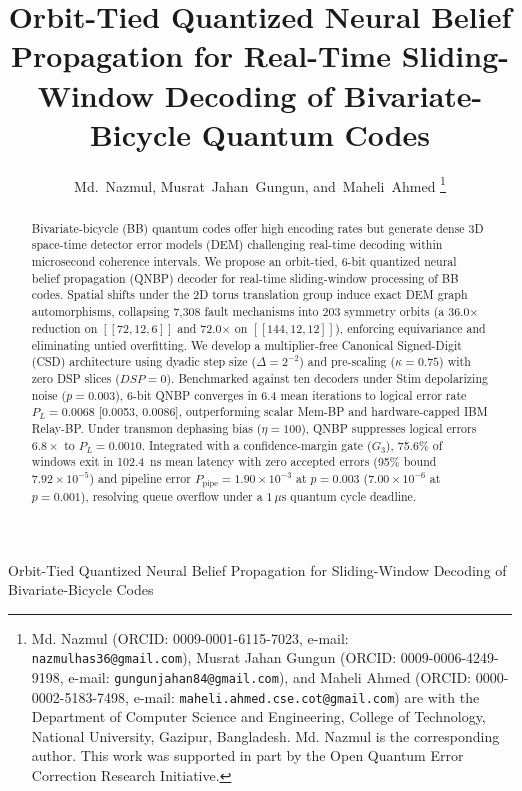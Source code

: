 \documentclass[journal]{IEEEtran}
\begin{document}
\title{Orbit-Tied Quantized Neural Belief Propagation for Real-Time Sliding-Window Decoding of Bivariate-Bicycle Quantum Codes}

\author{Md.~Nazmul,
        Musrat~Jahan~Gungun,
        and~Maheli~Ahmed%
\thanks{Md. Nazmul (ORCID: 0009-0001-6115-7023, e-mail: \texttt{nazmulhas36@gmail.com}), Musrat Jahan Gungun (ORCID: 0009-0006-4249-9198, e-mail: \texttt{gungunjahan84@gmail.com}), and Maheli Ahmed (ORCID: 0000-0002-5183-7498, e-mail: \texttt{maheli.ahmed.cse.cot@gmail.com}) are with the Department of Computer Science and Engineering, College of Technology, National University, Gazipur, Bangladesh. Md. Nazmul is the corresponding author. This work was supported in part by the Open Quantum Error Correction Research Initiative.}}

%
{Orbit-Tied Quantized Neural Belief Propagation for Sliding-Window Decoding of Bivariate-Bicycle Codes}

\maketitle

\begin{abstract}
Bivariate-bicycle (BB) quantum codes offer high encoding rates but generate dense 3D space-time detector error models (DEM) challenging real-time decoding within microsecond coherence intervals. We propose an orbit-tied, 6-bit quantized neural belief propagation (QNBP) decoder for real-time sliding-window processing of BB codes. Spatial shifts under the 2D torus translation group induce exact DEM graph automorphisms, collapsing 7,308 fault mechanisms into 203 symmetry orbits (a 36.0$\times$ reduction on $[[72,12,6]]$ and 72.0$\times$ on $[[144,12,12]]$), enforcing equivariance and eliminating untied overfitting. We develop a multiplier-free Canonical Signed-Digit (CSD) architecture using dyadic step size ($\Delta = 2^{-2}$) and pre-scaling ($\kappa = 0.75$) with zero DSP slices ($DSP=0$). Benchmarked against ten decoders under Stim depolarizing noise ($p = 0.003$), 6-bit QNBP converges in 6.4 mean iterations to logical error rate $P_L = 0.0068$ [0.0053, 0.0086], outperforming scalar Mem-BP and hardware-capped IBM Relay-BP. Under transmon dephasing bias ($\eta = 100$), QNBP suppresses logical errors $6.8\times$ to $P_L = 0.0010$. Integrated with a confidence-margin gate ($G_3$), 75.6\% of windows exit in 102.4~ns mean latency with zero accepted errors (95\% bound $7.92 \times 10^{-5}$) and pipeline error $P_{\text{pipe}} = 1.90 \times 10^{-3}$ at $p = 0.003$ ($7.00 \times 10^{-6}$ at $p = 0.001$), resolving queue overflow under a $1\,\mu\text{s}$ quantum cycle deadline.
\end{abstract}
\end{document}
